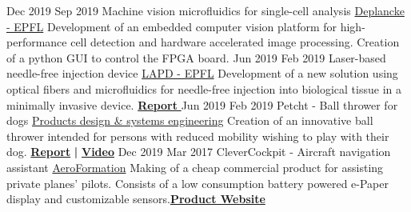 \documentclass[a4paper]{twentysecondcv} %
\begin{document}
\begin{twenty} %
    \twentyitem
    	{Dec 2019}
		{Sep 2019}
        {Machine vision microfluidics for single-cell analysis}
        {\href{https://deplanckelab.epfl.ch}{Deplancke - EPFL}}
        {
        Development of an embedded computer vision platform for high-performance cell detection and hardware accelerated image processing. Creation of a python GUI to control the FPGA board.}
        {}
     \twentyitem
    	{Jun 2019}
		{Feb 2019}
        {Laser-based needle-free injection device}
        {\href{https://lapd.epfl.ch/}{LAPD - EPFL}}
        {
        Development of a new solution using optical fibers and microfluidics for needle-free injection into biological tissue in a minimally invasive device. \hfill
        \href{http://fdeg.ch/Reports/LAPD_Report.pdf}{\textbf{Report \mpoint}}  
        }
        {}
    \twentyitem
    	{Jun 2019}
		{Feb 2019}
        {\textcolor{pblue}{P}etch\hspace{0.2mm}\textcolor{pblue}{\scalebox{1.2}{i}}t - Ball thrower for dogs}
        {\href{https://edu.epfl.ch/coursebook/en/products-design-systems-engineering-MICRO-406}{Products design \& systems engineering}}
        {
        Creation of an innovative ball thrower intended for persons with reduced mobility wishing to play with their dog.\hfill
        \href{http://fdeg.ch/Reports/PetchIt_Report.pdf}{\textbf{Report}} \textbf{|}
        \href{https://www.youtube.com/watch?v=D7fW0_doyIM&list=PLYHF3kEHYpgcjWwVfPJ-mZfmi9ZN5I3l9}{\textbf{Video}} \mpoint
        }
        {}
    \twentyitem
    	{Dec 2019}
		{Mar 2017}
        {CleverCockpit - Aircraft navigation assistant}
        {\href{http://www.aeroformation.ch/Bienvenue.html}{AeroFormation}}
        {
        Making of a cheap commercial product for assisting private planes' pilots. Consists of a low consumption battery powered e-Paper display and customizable sensors.\hfill \href{http://clevercockpit.ch/}{\textbf{Product Website \mpoint}}
        }
        {}
        \\
\end{twenty}
\end{document}
